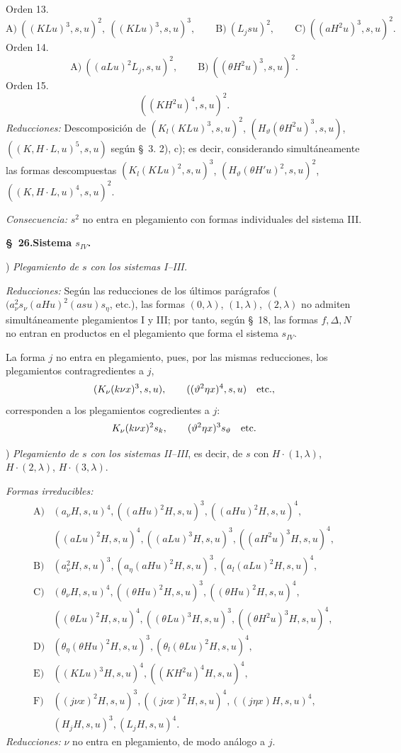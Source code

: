 \documentclass[11pt]{article}
\newcommand{\D}{\Delta}
\begin{document}
\noindent Orden 13.
\[
\text{A)}\ ((KLu)^3,s,u)^2,\ ((KLu)^3,s,u)^3,\qquad
\text{B)}\ (L_jsu)^2,
\qquad
\text{C)}\ ((aH^2u)^3,s,u)^2.
\]
\noindent Orden 14.
\[
\text{A)}\ ((aLu)^2L_j,s,u)^2,
\qquad
\text{B)}\ ((\theta H^2u)^3,s,u)^2.
\]
\noindent Orden 15.
\[
 ((KH^2u)^4,s,u)^2.
\]
\noindent\emph{Reducciones:} Descomposición de $(K_l(KLu)^3,s,u)^2$, $(H_\vartheta(\theta H^2u)^3,s,u)$, $((K,H\cdot L,u)^5,s,u)$ según \S\ 3. 2), c); es decir, considerando simultáneamente las formas descompuestas $(K_l(KLu)^2,s,u)^3$, $(H_\vartheta(\theta H'u)^2,s,u)^2$, $((K,H\cdot L,u)^4,s,u)^2$.

\noindent\emph{Consecuencia:} $s^2$ no entra en plegamiento con formas individuales del sistema III.

\begin{center}\textbf{\S\ 26.\quad Sistema $s_{IV}$.}\end{center}
) \emph{Plegamiento de $s$ con los sistemas I--III.}

\noindent\emph{Reducciones:} Según las reducciones de los últimos parágrafos ($(a_\nu^2s_\nu(aHu)^2(asu)s_\eta$, etc.), las formas $(0,\lambda)$, $(1,\lambda)$, $(2,\lambda)$ no admiten simultáneamente plegamientos I y III; por tanto, según \S\ 18, las formas $f,\D,N$ no entran en productos en el plegamiento que forma el sistema $s_{IV}$.

La forma $j$ no entra en plegamiento, pues, por las mismas reducciones, los plegamientos contragredientes a $j$,
\[
(K_\nu(k\nu x)^3,s,u),\qquad ((\vartheta^2\eta x)^4,s,u)\quad\hbox{etc.},
\]
corresponden a los plegamientos cogredientes a $j$:
\[
K_\nu(k\nu x)^2s_k,
\qquad (\vartheta^2\eta x)^3s_\vartheta\quad\hbox{etc.}
\]

) \emph{Plegamiento de $s$ con los sistemas II--III}, es decir, de $s$ con $H\cdot(1,\lambda)$, $H\cdot(2,\lambda)$, $H\cdot(3,\lambda)$.

\noindent\emph{Formas irreducibles:}
\[
\begin{array}{rl}
\text{A)}&(a_\nu H,s,u)^4,
((aHu)^2H,s,u)^3,
((aHu)^2H,s,u)^4,\\
&((aLu)^2H,s,u)^4,
((aLu)^3H,s,u)^3,
((aH^2u)^3H,s,u)^4,\\[0.3em]
\text{B)}&(a_\nu^2H,s,u)^3,
(a_\eta(aHu)^2H,s,u)^3,
(a_l(aLu)^2H,s,u)^4,\\[0.3em]
\text{C)}&(\theta_\nu H,s,u)^4,
((\theta Hu)^2H,s,u)^3,
((\theta Hu)^2H,s,u)^4,\\
&((\theta Lu)^2H,s,u)^4,
((\theta Lu)^3H,s,u)^3,
((\theta H^2u)^3H,s,u)^4,\\[0.3em]
\text{D)}&(\theta_\eta(\theta Hu)^2H,s,u)^3,
(\theta_l(\theta Lu)^2H,s,u)^4,\\[0.3em]
\text{E)}&((KLu)^3H,s,u)^4,
((KH^2u)^4H,s,u)^4,\\[0.3em]
\text{F)}&((j\nu x)^2H,s,u)^3,
((j\nu x)^2H,s,u)^4,
((j\eta x)H,s,u)^4,\\
&(H_jH,s,u)^3,
(L_jH,s,u)^4.
\end{array}
\]
\noindent\emph{Reducciones:} $\nu$ no entra en plegamiento, de modo análogo a $j$.
\end{document}
